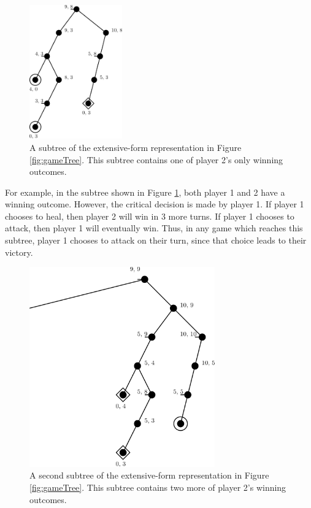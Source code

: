 \begin{figure}[H]
  \centering
  \includegraphics[width=4cm]{figures/GameSubtree.png}
  \caption{A subtree of the extensive-form representation in Figure \ref{fig:gameTree}. This subtree contains one of player 2's only winning outcomes.}
  \label{fig:gameSubtree}
\end{figure}

For example, in the subtree shown in Figure \ref{fig:gameSubtree}, both player 1 and 2 have a winning outcome. However, the critical decision is made by player 1. If player 1 chooses to heal, then player 2 will win in 3 more turns. If player 1 chooses to attack, then player 1 will eventually win. Thus, in any game which reaches this subtree, player 1 chooses to attack on their turn, since that choice leads to their victory.\\

\begin{figure}[H]
  \centering
  \includegraphics[width=8cm]{figures/GameSubtree2.png}
  \caption{A second subtree of the extensive-form representation in Figure \ref{fig:gameTree}. This subtree contains two more of player 2's winning outcomes.}
  \label{fig:gameSubtree2}
\end{figure}

